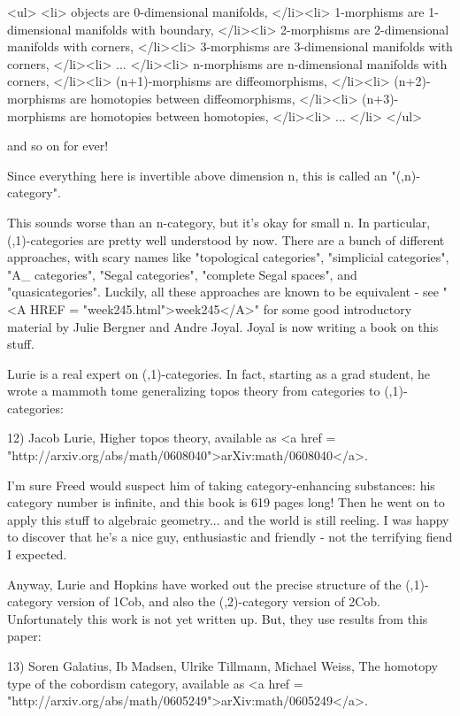 <ul>
<li>
 objects are 0-dimensional manifolds,
</li><li>
 1-morphisms are 1-dimensional manifolds with boundary,
</li><li>
 2-morphisms are 2-dimensional manifolds with corners,
</li><li>
 3-morphisms are 3-dimensional manifolds with corners,
</li><li>
...
</li><li>
 n-morphisms are n-dimensional manifolds with corners,
</li><li>
 (n+1)-morphisms are diffeomorphisms,
</li><li>
 (n+2)-morphisms are homotopies between diffeomorphisms,
</li><li>
 (n+3)-morphisms are homotopies between homotopies,
</li><li>
...
</li>
</ul>

and so on for ever!

Since everything here is invertible above dimension n, this is 
called an "(\infty ,n)-category".  

This sounds worse than an n-category, but it's okay for small n.  In
particular, (\infty ,1)-categories are pretty well understood by now.
There are a bunch of different approaches, with scary names like
"topological categories", "simplicial categories",
"A_{\infty } categories", "Segal categories",
"complete Segal spaces", and "quasicategories".
Luckily, all these approaches are known to be equivalent - see
"<A HREF = "week245.html">week245</A>" for some good
introductory material by Julie Bergner and Andre Joyal.  Joyal is now
writing a book on this stuff.

Lurie is a real expert on (\infty ,1)-categories.  In fact, 
starting as a grad student, he wrote a mammoth tome generalizing 
topos theory from categories to (\infty ,1)-categories:

12) Jacob Lurie, Higher topos theory, available as 
<a href = "http://arxiv.org/abs/math/0608040">arXiv:math/0608040</a>.

I'm sure Freed would suspect him of taking category-enhancing
substances: his category number is infinite, and this book is
619 pages long!  Then he went on to apply this stuff to algebraic
geometry... and the world is still reeling.  I was happy to 
discover that he's a nice guy, enthusiastic and friendly - not
the terrifying fiend I expected.  

Anyway, Lurie and Hopkins have worked out the precise structure 
of the (\infty ,1)-category version of 1Cob, and also the 
(\infty ,2)-category version of 2Cob.  Unfortunately this work
is not yet written up.  But, they use results from this paper:

13) Soren Galatius, Ib Madsen, Ulrike Tillmann, Michael Weiss,
The homotopy type of the cobordism category, available as 
<a href = "http://arxiv.org/abs/math/0605249">arXiv:math/0605249</a>.

